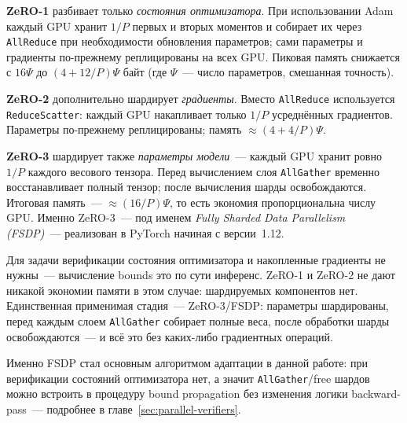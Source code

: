 \textbf{ZeRO-1} разбивает только \textit{состояния оптимизатора}.
При использовании Adam каждый GPU хранит $1/P$ первых и вторых
моментов и собирает их через \texttt{AllReduce} при необходимости обновления параметров;
сами параметры и градиенты по-прежнему реплицированы на всех GPU.
Пиковая память снижается с $16\Psi$ до $(4 + 12/P)\Psi$ байт
(где $\Psi$~--- число параметров, смешанная точность).

\textbf{ZeRO-2} дополнительно шардирует \textit{градиенты}.
Вместо \texttt{AllReduce} используется \texttt{ReduceScatter}:
каждый GPU накапливает только $1/P$ усреднённых градиентов.
Параметры по-прежнему реплицированы; память $\approx (4 + 4/P)\Psi$.

\textbf{ZeRO-3} шардирует также \textit{параметры модели}~---
каждый GPU хранит ровно $1/P$ каждого весового тензора.
Перед вычислением слоя \texttt{AllGather} временно восстанавливает
полный тензор; после вычисления шарды освобождаются.
Итоговая память~--- $\approx (16/P)\Psi$, то есть экономия
пропорциональна числу GPU. Именно ZeRO-3~--- под именем
\textit{Fully Sharded Data Parallelism (FSDP)}~--- реализован
в PyTorch начиная с версии~1.12.

Для задачи верификации состояния оптимизатора и накопленные
градиенты не нужны~--- вычисление bounds это по сути инференс.
ZeRO-1 и ZeRO-2 не дают никакой экономии памяти в этом случае:
шардируемых компонентов нет. Единственная применимая стадия~---
ZeRO-3/FSDP: параметры шардированы, перед каждым слоем
\texttt{AllGather} собирает полные веса, после обработки шарды
освобождаются~--- и всё это без каких-либо градиентных операций.

Именно FSDP стал основным алгоритмом адаптации в данной работе:
при верификации состояний оптимизатора нет, а значит \texttt{AllGather}/free
шардов можно встроить в процедуру bound propagation без изменения
логики backward-pass~--- подробнее в главе~\ref{sec:parallel-verifiers}.

